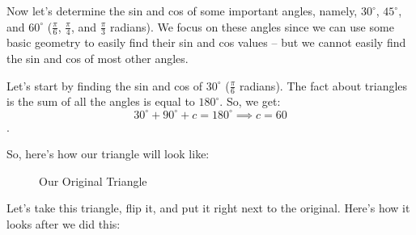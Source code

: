 \label{les_6:part_3_intro_to_trig_functions}

Now let's determine the sin and cos of some important angles, namely,
$30^{\circ}$, $45^{\circ}$, and $60^{\circ}$ ($\frac{\pi}{6}$, $\frac{\pi}{4}$,
and $\frac{\pi}{3}$ radians). We focus on these angles since we can use some
basic geometry to easily find their sin and cos values -- but we cannot easily
find the sin and cos of most other angles.

Let's start by finding the sin and cos of $30^{\circ}$ ($\frac{\pi}{6}$
radians). The fact about triangles is the sum of all the angles is equal to
$180^{\circ}$. So, we get:
\[ 30^{\circ} + 90^{\circ} + c = 180^{\circ} \implies c = 60 \].

So, here's how our triangle will look like:

\begin{figure}[htpb]
  \centering


  \caption{Our Original Triangle}
  \label{fig:30_60_90_triangle}
\end{figure}

Let's take this triangle, flip it, and put it right next to the original. Here's
how it looks after we did this:

